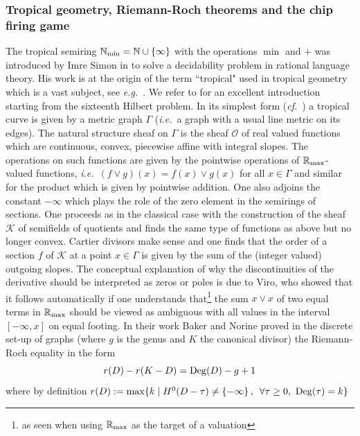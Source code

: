 \documentclass[12pt]{article}
\def\qqq{\,,\quad~\forall}
\def\N{{\mathbb N}}
\def\R{{\mathbb R}}
\def\cK{{\mathcal K}}
\def\cO{{\mathcal O}}
\def\qqq{\,,\,~\forall}
\newcommand{\ie}{{\it i.e.\/}\ }
\newcommand{\eg}{{\it e.g.\/}\ }
\newcommand{\cff}{{\it cf.}~}
\def\rma{\R_{\rm max}}
\def\Deg{{\rm Deg}}
\begin{document}
\subsubsection{Tropical geometry, Riemann-Roch theorems and the chip firing game}

The tropical semiring $\N_{\rm min}=\N\cup\{\infty\}$ with the operations $\min$ and $+$ was introduced by Imre Simon in \cite{Simon} to solve a decidability problem in rational language theory. His work is at the origin of the term ``tropical" used in tropical geometry which is a vast subject, see \eg \cite{Gelfand, Kap1, Mik,Sturm}. We refer to \cite{virotagaki} for an excellent introduction starting from the sixteenth Hilbert problem.  In its simplest form (\cff\cite{GK}) a tropical curve is given by a metric graph $\Gamma$ (\ie a graph with a usual line metric on its edges). The natural structure sheaf on $\Gamma$ is the sheaf $\cO$ of real valued functions which are continuous, convex, piecewise affine with integral slopes. The operations on such functions are given by the pointwise operations of $\rma$-valued functions, \ie $(f\vee g)(x)=f(x)\vee g(x)$ for all $x\in \Gamma$ and similar for the product which is given by pointwise addition. One also adjoins the constant $-\infty$ which plays the role of the zero element in the semirings of sections. One proceeds as in the classical case with the construction of the sheaf $\cK$ of semifields of quotients and finds the same type of functions as above but no longer convex. Cartier divisors make sense and one finds that the order of a section $f$ of $\cK$ at a point $x\in\Gamma$ is given by the sum of the (integer valued) outgoing slopes. The conceptual explanation of why the discontinuities of the derivative should be interpreted as zeros or poles is due to Viro, \cite{viro} who showed that it follows automatically if one understands that\footnote{as seen when using $\rma$ as the target of a valuation} the sum $x\vee x$ of two equal terms in $\rma$ should be viewed as ambiguous with all values in the interval $[-\infty, x]$ on equal footing. In their work Baker and Norine \cite{BN} proved in the discrete set-up of graphs (where $g$ is the genus and $K$ the canonical divisor) the
Riemann-Roch  equality in the form 
\begin{equation}\label{rr1}
r(D)-r(K-D)=\Deg(D)-g+1
\end{equation}
where by definition 
$r(D):=\max \{k\mid H^0(D-\tau )\neq \{-\infty\}\qqq \tau \geq 0,\ \Deg(\tau)=k\}$
\end{document}
